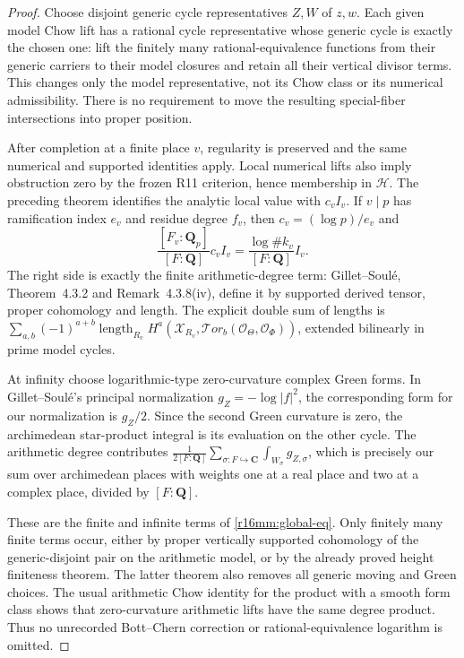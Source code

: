 \begin{proof}
Choose disjoint generic cycle representatives $Z,W$ of $z,w$.
Each given model Chow lift has a rational cycle representative
whose generic cycle is exactly the chosen one: lift the finitely
many rational-equivalence functions from their generic carriers
to their model closures and retain all their vertical divisor
terms. This changes only the model representative, not its
Chow class or its numerical admissibility. There is no requirement
to move the resulting special-fiber intersections into proper
position.

After completion at a finite place $v$, regularity is preserved
and the same numerical and supported identities apply. Local
numerical lifts also imply obstruction zero by the frozen
R11 criterion, hence membership in $\mathcal H$. The preceding
theorem identifies the analytic local value with $c_v I_v$.
If $v\mid p$ has ramification index $e_v$ and residue degree
$f_v$, then $c_v=(\log p)/e_v$ and
\[
 \frac{[F_v:\mathbf Q_p]}{[F:\mathbf Q]}c_v I_v
             =\frac{\log\#k_v}{[F:\mathbf Q]}I_v.
 \tag{MM16.11}\label{r16mm:weight}
\]
The right side is exactly the finite arithmetic-degree term:
Gillet--Soul\'e, Theorem~4.3.2 and Remark~4.3.8(iv), define it
by supported derived tensor, proper cohomology and length.
The explicit double sum of lengths is
$\sum_{a,b}(-1)^{a+b}\operatorname{length}_{R_v}
H^a(\mathcal X_{R_v},\mathcal{T}or_b(\mathcal O_{\Theta},
\mathcal O_{\Phi}))$, extended bilinearly in prime model cycles.

At infinity choose logarithmic-type zero-curvature complex
Green forms. In Gillet--Soul\'e's principal normalization
$g_Z=-\log|f|^2$, the corresponding form for our normalization
is $g_Z/2$. Since the second Green curvature is zero, the
archimedean star-product integral is its evaluation on the
other cycle. The arithmetic degree contributes
$\frac1{2[F:\mathbf Q]}\sum_{\sigma:F\hookrightarrow\mathbf C}
\int_{W_\sigma}g_{Z,\sigma}$, which is precisely our sum over
archimedean places with weights one at a real place and two
at a complex place, divided by $[F:\mathbf Q]$.

These are the finite and infinite terms of
\eqref{r16mm:global-eq}. Only finitely many finite terms occur,
either by proper vertically supported cohomology of the
generic-disjoint pair on the arithmetic model, or by the
already proved height finiteness theorem. The latter theorem
also removes all generic moving and Green choices. The usual
arithmetic Chow identity for the product with a smooth form
class shows that zero-curvature arithmetic lifts have the
same degree product. Thus no unrecorded Bott--Chern correction
or rational-equivalence logarithm is omitted.
\end{proof}

